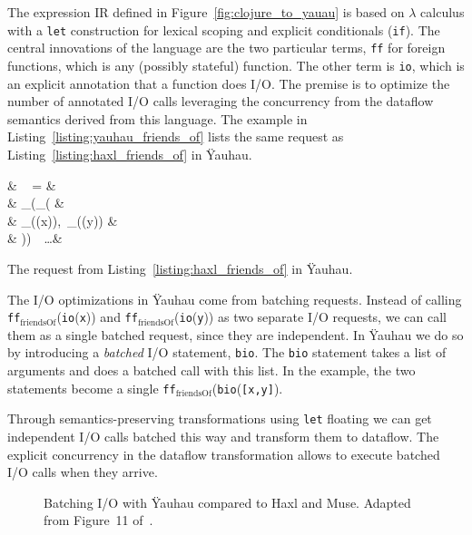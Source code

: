 The expression \ac{IR} defined in Figure~\ref{fig:clojure_to_yauau} is based on $\lambda$ calculus with a \texttt{let} construction for lexical scoping and explicit conditionals (\texttt{if}).
The central innovations of the language are the two particular terms, \texttt{ff} for foreign functions, which is any (possibly stateful) function.
The other term is \texttt{io}, which is an explicit annotation that a function does \ac{I/O}.
The premise is to optimize the number of annotated \ac{I/O} calls leveraging the concurrency from the dataflow semantics derived from this language.
The example in Listing~\ref{listing:yauhau_friends_of} lists the same request as Listing~\ref{listing:haxl_friends_of} in \"{Y}auhau.

\begin{listing}
\begin{flalign*}
& ~ = & \\ 
& \quad {}_(_( & \\ 
& \quad \quad {}_((x)),~_((y)) & \\
& \quad ))~~\ldots & 
\end{flalign*}
\caption{The request from Listing~\ref{listing:haxl_friends_of} in \"{Y}auhau.}
\label{listing:yauhau_friends_of}
\end{listing}

The \ac{I/O} optimizations in \"{Y}auhau come from batching requests.
Instead of calling \texttt{ff}$_\text{friendsOf}$(\texttt{io}(\texttt{x})) and \texttt{ff}$_\text{friendsOf}$(\texttt{io}(\texttt{y})) as two separate \ac{I/O} requests, we can call them as a single batched request, since they are independent.
In \"{Y}auhau we do so by introducing a \emph{batched} \ac{I/O} statement, \texttt{bio}.
The \texttt{bio} statement takes a list of arguments and does a batched call with this list.
In the example, the two statements become a single \texttt{ff}$_\text{friendsOf}$(\texttt{bio}(\texttt{[x,y]}).

Through semantics-preserving transformations using \texttt{let} floating we can get independent \ac{I/O} calls batched this way and transform them to dataflow.
The explicit concurrency in the dataflow transformation allows to execute batched \ac{I/O} calls when they arrive.




\begin{figure}[t]
    	\centering
		\caption{Batching \ac{I/O} with \"{Y}auhau compared to Haxl and Muse. Adapted from Figure~11 of~\cite{ertel_cc18}.}	
		\label{fig:yauhau_baseline}
\end{figure}

